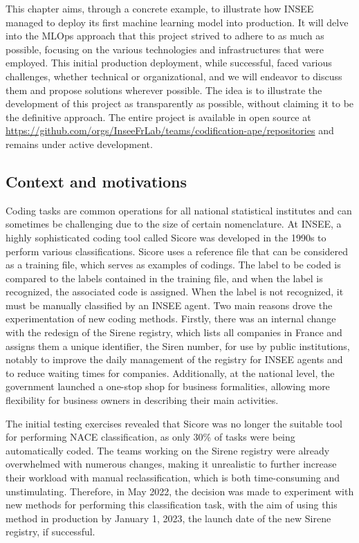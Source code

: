 This chapter aims, through a concrete example, to illustrate how INSEE managed to deploy its first machine learning model into production. It will delve into the MLOps approach that this project strived to adhere to as much as possible, focusing on the various technologies and infrastructures that were employed. This initial production deployment, while successful, faced various challenges, whether technical or organizational, and we will endeavor to discuss them and propose solutions wherever possible. The idea is to illustrate the development of this project as transparently as possible, without claiming it to be the definitive approach. The entire project is available in open source at \url{https://github.com/orgs/InseeFrLab/teams/codification-ape/repositories} and remains under active development.

\subsection{Context and motivations}

Coding tasks are common operations for all national statistical institutes and can sometimes be challenging due to the size of certain nomenclature. At INSEE, a highly sophisticated coding tool called Sicore was developed in the 1990s to perform various classifications. Sicore uses a reference file that can be considered as a training file, which serves as examples of codings. The label to be coded is compared to the labels contained in the training file, and when the label is recognized, the associated code is assigned. When the label is not recognized, it must be manually classified by an INSEE agent. Two main reasons drove the experimentation of new coding methods. Firstly, there was an internal change with the redesign of the Sirene registry, which lists all companies in France and assigns them a unique identifier, the Siren number, for use by public institutions, notably to improve the daily management of the registry for INSEE agents and to reduce waiting times for companies. Additionally, at the national level, the government launched a one-stop shop for business formalities, allowing more flexibility for business owners in describing their main activities.

The initial testing exercises revealed that Sicore was no longer the suitable tool for performing NACE classification, as only 30\% of tasks were being automatically coded. The teams working on the Sirene registry were already overwhelmed with numerous changes, making it unrealistic to further increase their workload with manual reclassification, which is both time-consuming and unstimulating. Therefore, in May 2022, the decision was made to experiment with new methods for performing this classification task, with the aim of using this method in production by January 1, 2023, the launch date of the new Sirene registry, if successful.




